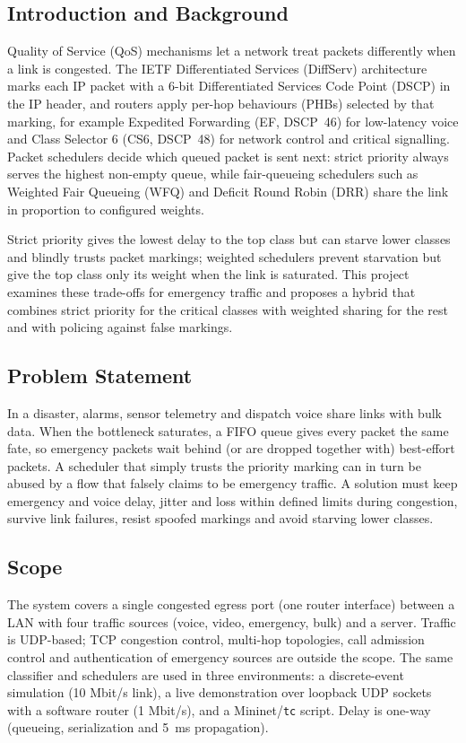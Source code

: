 \documentclass[12pt,a4paper]{article}
\newcommand{\code}[1]{\texttt{#1}}
\begin{document}
\subsection{Introduction and Background}
Quality of Service (QoS) mechanisms let a network treat packets differently when a link is
congested. The IETF Differentiated Services (DiffServ) architecture \cite{rfc2474,rfc2475} marks
each IP packet with a 6-bit Differentiated Services Code Point (DSCP) in the IP header, and routers
apply per-hop behaviours (PHBs) selected by that marking, for example Expedited Forwarding (EF,
DSCP~46) for low-latency voice \cite{rfc3246} and Class Selector 6 (CS6, DSCP~48) for network
control and critical signalling. Packet schedulers decide which queued packet is sent next:
strict priority always serves the highest non-empty queue, while fair-queueing schedulers such as
Weighted Fair Queueing (WFQ) \cite{demers1989} and Deficit Round Robin (DRR) \cite{shreedhar1996}
share the link in proportion to configured weights.

Strict priority gives the lowest delay to the top class but can starve lower classes and blindly
trusts packet markings; weighted schedulers prevent starvation but give the top class only its
weight when the link is saturated. This project examines these trade-offs for emergency traffic and
proposes a hybrid that combines strict priority for the critical classes with weighted sharing for
the rest and with policing against false markings.

\subsection{Problem Statement}
In a disaster, alarms, sensor telemetry and dispatch voice share links with bulk data. When the
bottleneck saturates, a FIFO queue gives every packet the same fate, so emergency packets wait
behind (or are dropped together with) best-effort packets. A scheduler that simply trusts the
priority marking can in turn be abused by a flow that falsely claims to be emergency traffic. A
solution must keep emergency and voice delay, jitter and loss within defined limits during
congestion, survive link failures, resist spoofed markings and avoid starving lower classes.

\subsection{Scope}
The system covers a single congested egress port (one router interface) between a LAN with four
traffic sources (voice, video, emergency, bulk) and a server. Traffic is UDP-based; TCP congestion
control, multi-hop topologies, call admission control and authentication of emergency sources are
outside the scope. The same classifier and schedulers are used in three environments: a
discrete-event simulation (10 Mbit/s link), a live demonstration over loopback UDP sockets with a
software router (1 Mbit/s), and a Mininet/\code{tc} script. Delay is one-way (queueing,
serialization and 5~ms propagation).
\end{document}
